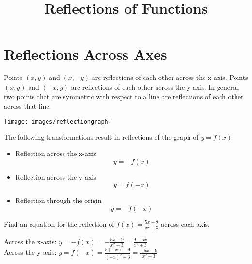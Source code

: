 \documentclass[handout, noauthor, nooutcomes]{ximera}
\author{}
\title{Reflections of Functions}
\begin{document}
\begin{abstract}
  
\end{abstract}
\maketitle


%



\section{Reflections Across Axes}
Points $(x,y)$ and $(x,-y)$ are reflections of each other across the x-axis. Points $(x, y)$ and $(-x, y)$ are reflections of each other across the y-axis. In general, two points that are symmetric with respect to a line are reflections of each other across that line.
\begin{image}
\texttt{[image: images/reflectiongraph]}
\end{image}
\begin{callout}
The following transformations result in reflections of the graph of $y = f(x)$
\begin{itemize}
\item Reflection across the x-axis
\[
y=-f(x)
\]
\item Reflection across the y-axis
\[
y=f(-x)
\]
\item Reflection through the origin
\[
y=-f(-x)
\]
\end{itemize}
\end{callout}
\begin{example}
Find an equation for the reflection of $f(x) = \frac{5x - 9}{x^2+3}$ across each axis.
\\
\begin{explanation}
Across the x-axis: $y = -f(x) = -\frac{5x-9}{x^2+3}=\frac{9-5x}{x^2+3}$
\\
Across the y-axis: $y = f(-x) = \frac{5(-x)-9}{(-x)^2+3}=\frac{-5x-9}{x^2+3}$
\end{explanation}
\end{example}
\end{document}
